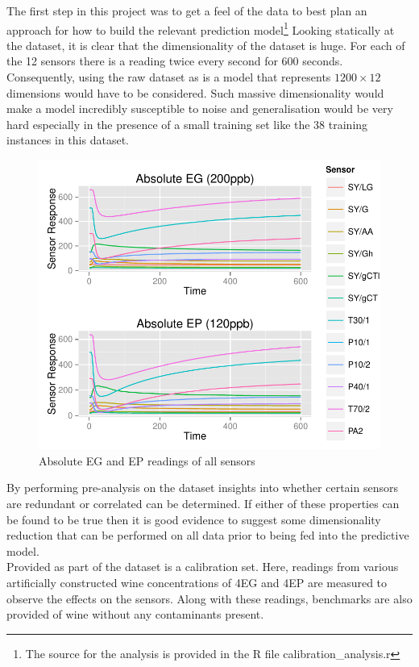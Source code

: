 \documentclass[twocolumn]{article}
\begin{document}
The first step in this project was to get a feel of the data to best plan an approach for how to
build the relevant prediction model\footnote{The source for the analysis is provided in the R file calibration\_analysis.r}
Looking statically at the dataset, it is clear that the dimensionality of the dataset is huge. For each of the 12 sensors there 
is a reading twice every second for 600 seconds. Consequently, using the raw dataset as is a model that represents $1200 \times 12$ 
dimensions would have to be considered. Such massive dimensionality would make a model incredibly susceptible to noise and 
generalisation would be very hard especially in the presence of a small training set like the 38 training instances in this dataset. 
\begin{figure}[h!]
	\includegraphics[trim = 0mm 0mm 0mm 0mm, clip, scale=0.55]{absoluteEGEPreadings.pdf}
	\caption{Absolute EG and EP readings of all sensors}
	\label{fig:absoluteAnalyteReadings}
\end{figure}
By performing pre-analysis on the dataset insights into whether certain sensors are
redundant or correlated can be determined. If either of these properties can be found to be true then it is good evidence to suggest some
dimensionality reduction that can be performed on all data prior to being fed into the predictive model. \\
Provided as part of the dataset is a calibration set. Here, readings from various artificially constructed wine 
concentrations of 4EG and 4EP are measured to observe the effects on the sensors. Along with these readings, benchmarks 
are also provided of wine without any contaminants present. 
\end{document}
